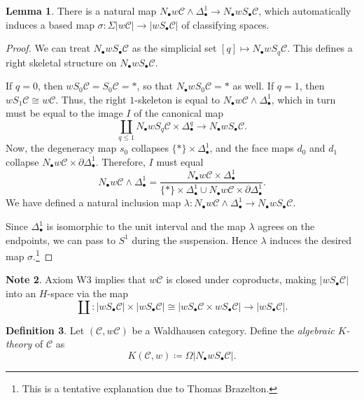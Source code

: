 \documentclass[10pt,letterpaper,cm]{nupset}
\theoremstyle{definition}
\newtheorem{definition}{Definition}
\newtheorem{note}[definition]{Note}
\theoremstyle{theorem}
\newtheorem{lemma}[definition]{Lemma}
\theoremstyle{remark}
\newcommand{\1}{\mathbf{1}}
\renewcommand{\c}{\mathscr{C}}
\newcommand{\0}{\vec 0}
\begin{document}
\begin{lemma}
There is a natural map $N_{\bullet} w{\c} \land \Delta_{\bullet}^1 \to N_{\bullet} w S_{\bullet} \c$, which automatically induces a based map $\sigma : \Sigma \left\lvert{w{\c}}\right\rvert\to \left\lvert{w S_{\bullet} \c}\right\rvert$ of classifying spaces.
\end{lemma}
\begin{proof}
We can treat $N_{\bullet} w S_{\bullet} \c$ as the simplicial set $\left[q\right] \mapsto N_{\bullet} w S_q \c$. This defines a right skeletal structure on $N_{\bullet} w S_{\bullet} \c$. 


 If $q = 0$, then $w S_0 \c = S_0 \c = \ast$, so that $N_{\bullet} w S_0\c = \ast$ as well. If $q= 1$, then
$w S_1 \c \cong w{\c}$. Thus, the right $1$-skeleton is equal to $N_{\bullet} w{\c}  \land \Delta_{\bullet}^1$, which in turn must be equal to the image $I$ of the canonical map $$\coprod_{q\leq 1} N_{\bullet} w S_q \c \times \Delta_{\bullet}^q \to N_{\bullet} w S_{\bullet} \c.$$ Now, the degeneracy map $s_0$ collapses $\{\ast\} \times \Delta_{\bullet}^1$, and the face maps $d_0$ and $d_1$ collapse $ N_{\bullet} w{\c} \times \partial{\Delta_{\bullet}^1}$. 
Therefore, $I$ must equal $$N_{\bullet} w{\c}  \land \Delta_{\bullet}^1  = \frac{N_{\bullet} w{\c} \times \Delta_{\bullet}^1}{\{\ast\} \times \Delta_{\bullet}^1 \cup N_{\bullet} w{\c} \times \partial{\Delta_{\bullet}^1}}.$$  We have defined a natural inclusion map $\lambda : N_{\bullet} w{\c} \land \Delta_{\bullet}^1 \to  N_{\bullet} w S_{\bullet} \c$.

Since $\Delta_{\bullet}^1$ is isomorphic to the unit interval and the map $\lambda$ agrees on the endpoints, we can pass to $S^1$ during the suspension. Hence $\lambda$  induces the desired map $\sigma$.\footnote{This is a tentative explanation due to Thomas Brazelton.}
\end{proof}

\begin{note}
Axiom W3 implies that $w{\c}$ is closed under coproducts, making $\left\lvert{wS_{\bullet} \c}\right\rvert$ into an $H$-space via the map $$\coprod: \left\lvert{wS_{\bullet} \c}\right\rvert \times \left\lvert{wS_{\bullet} \c}\right\rvert \cong \left\lvert{wS_{\bullet} \c \times  wS_{\bullet} \c}\right\rvert\to \left\lvert{wS_{\bullet} \c}\right\rvert.$$
\end{note}

\begin{definition}
Let $\left(\c, w{\c}\right)$ be a Waldhausen category. Define the \textit{algebraic $K$-theory} of $\c$ as $$K(\c, w) \coloneqq \Omega \left\lvert{ N_{\bullet} wS_{\bullet} \c}\right\rvert.$$ 
\end{definition}
\end{document}
